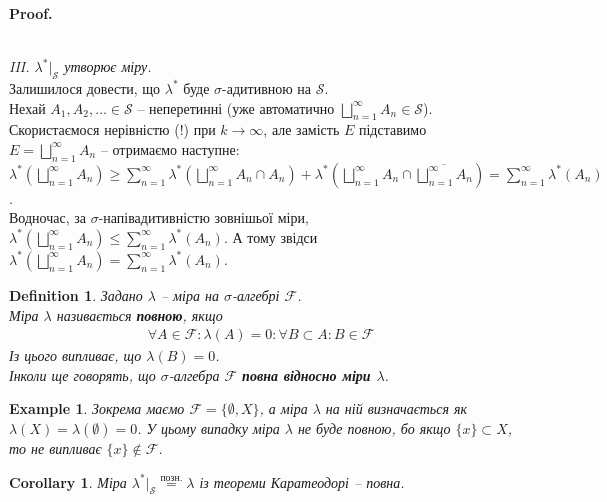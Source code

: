 \documentclass[a4paper, 10pt]{article}
\makeatletter
\theoremstyle{theoremdd}
\newtheorem{definition}[theorem]{Definition}
\newtheorem{example}[theorem]{Example}
\newtheorem{corollary}[theorem]{Corollary}
\renewenvironment{proof}[1][Proof.\\]{\par
\pushQED{\hfill \qed}%
\normalfont \topsep6\p@\@plus6\p@\relax
\trivlist
\item\relax
{\bfseries
#1\@addpunct{.}}\hspace\labelsep\ignorespaces
}{%
\popQED\endtrivlist\@endpefalse
}
\makeatother
\begin{document}
\begin{proof}
\bigskip \\
\textit{III. $\lambda^*|_{\mathcal{S}}$ утворює міру.}\\
Залишилося довести, що $\lambda^*$ буде $\sigma$-адитивною на $\mathcal{S}$.\\
Нехай $A_1,A_2,\dots \in \mathcal{S}$ -- неперетинні (уже автоматично $\displaystyle\bigsqcup_{n=1}^\infty A_n \in \mathcal{S}$). Скористаємося нерівністю (!) при $k \to \infty$, але замість $E$ підставимо $E = \displaystyle\bigsqcup_{n=1}^\infty A_n$ -- отримаємо наступне:\\
$\displaystyle\lambda^*\left(\bigsqcup_{n=1}^\infty A_n \right) \geq \sum_{n=1}^\infty \lambda^*\left(\bigsqcup_{n=1}^\infty A_n \cap A_n\right) + \lambda^*\left(\bigsqcup_{n=1}^\infty A_n \cap \overline{\bigsqcup_{n=1}^\infty A_n} \right) = \sum_{n=1}^\infty \lambda^*(A_n)$.\\
Водночас, за $\sigma$-напівадитивністю зовнішьої міри, $\displaystyle\lambda^*\left(\bigsqcup_{n=1}^\infty A_n\right) \leq \sum_{n=1}^\infty \lambda^*(A_n)$. А тому звідси\\
$\displaystyle\lambda^*\left(\bigsqcup_{n=1}^\infty A_n\right) = \sum_{n=1}^\infty \lambda^*(A_n)$.
\end{proof}

\begin{definition}
Задано $\lambda$ -- міра на $\sigma$-алгебрі $\mathcal{F}$.\\
Міра $\lambda$ називається \textbf{повною}, якщо
\begin{align*}
\forall A \in \mathcal{F}: \lambda(A) = 0: \forall B \subset A: B \in \mathcal{F}
\end{align*}
Із цього випливає, що $\lambda(B) = 0$.\\
Інколи ще говорять, що $\sigma$-алгебра $\mathcal{F}$ \textbf{повна відносно міри $\lambda$}.
\end{definition}

\begin{example}
Зокрема маємо $\mathcal{F} = \{\emptyset,X\}$, а міра $\lambda$ на ній визначається як $\lambda(X) = \lambda(\emptyset) = 0$. У цьому випадку міра $\lambda$ не буде повною, бо якщо $\{x\} \subset X$, то не випливає $\{x\} \notin \mathcal{F}$.
\end{example}

\begin{corollary}
Міра $\lambda^*|_{\mathcal{S}} \overset{\text{позн.}}{=} \lambda$ із теореми Каратеодорі -- повна.
\end{corollary}
\end{document}
